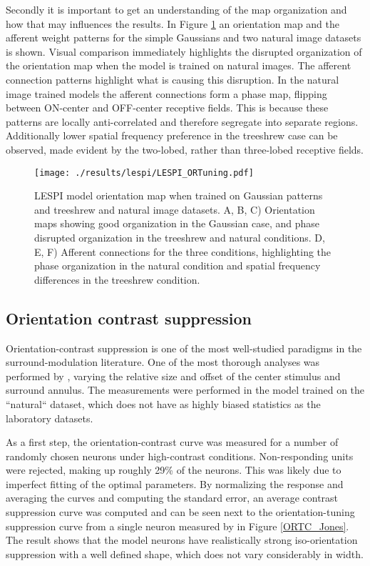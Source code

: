 Secondly it is important to get an understanding of the map
organization and how that may influences the results. In Figure
\ref{LESPI_ORTuning} an orientation map and the afferent weight
patterns for the simple Gaussians and two natural image datasets is
shown. Visual comparison immediately highlights the disrupted
organization of the orientation map when the model is trained on
natural images. The afferent connection patterns highlight what is
causing this disruption. In the natural image trained models the
afferent connections form a phase map, flipping between ON-center and
OFF-center receptive fields. This is because these patterns are
locally anti-correlated and therefore segregate into separate
regions. Additionally lower spatial frequency preference in the
treeshrew case can be observed, made evident by the two-lobed, rather
than three-lobed receptive fields.

\begin{figure}
	\centering
    \texttt{[image: ./results/lespi/LESPI\_ORTuning.pdf]}
	\caption[LESPI model orientation map when trained on Gaussian
      patterns and treeshrew and natural image datasets]{LESPI model
      orientation map when trained on Gaussian patterns and treeshrew
      and natural image datasets. A, B, C) Orientation maps showing
      good organization in the Gaussian case, and phase disrupted
      organization in the treeshrew and natural conditions. D, E, F)
      Afferent connections for the three conditions, highlighting the
      phase organization in the natural condition and spatial
      frequency differences in the treeshrew condition.}
	\label{LESPI_ORTuning}
\end{figure}


\subsection{Orientation contrast suppression}

Orientation-contrast suppression is one of the most well-studied
paradigms in the surround-modulation literature. One of the most
thorough analyses was performed by \cite{Jones2002}, varying the
relative size and offset of the center stimulus and surround annulus.
The measurements were performed in the model trained on the
``natural`` dataset, which does not have as highly biased statistics
as the laboratory datasets.

As a first step, the orientation-contrast curve was measured for a
number of randomly chosen neurons under high-contrast conditions.
Non-responding units were rejected, making up roughly 29\% of the
neurons. This was likely due to imperfect fitting of the optimal
parameters. By normalizing the response and averaging the curves and
computing the standard error, an average contrast suppression curve
was computed and can be seen next to the orientation-tuning
suppression curve from a single neuron measured by \cite{Jones2002} in
Figure \ref{ORTC_Jones}. The result shows that the model neurons have
realistically strong iso-orientation suppression with a well defined
shape, which does not vary considerably in width.

